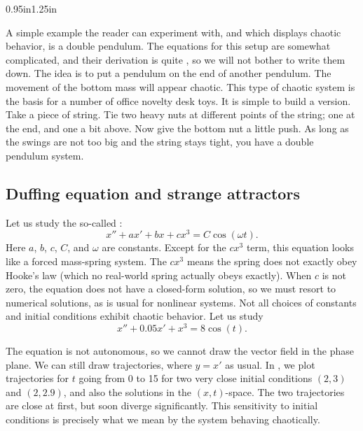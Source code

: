 \begin{mywrapfigsimp}{0.95in}{1.25in}
\noindent
{}
\end{mywrapfigsimp}
A simple example the reader can experiment with, and which displays
chaotic behavior, is a double pendulum.  The equations for this
setup are somewhat complicated, and their derivation is quite
, so we
will not bother to write them down.  The idea is to put a pendulum on the
end of another pendulum.  The movement of the bottom mass
will appear chaotic.  This type of chaotic system is the basis for a
number of office novelty desk toys.  It is simple to build a
version.  Take a piece of string.  Tie two heavy nuts at different
points of the string; one at the end, and one a bit above.  Now give the
bottom nut a little push.  As long as the swings are not too big and the
string stays tight, you have a double pendulum system.

\subsection{Duffing equation and strange attractors}

Let us study the so-called \emph{}:
\begin{equation*}
x'' + a x' + bx + cx^3 = C \cos(\omega t) .
\end{equation*}
Here $a$, $b$, $c$, $C$, and $\omega$ are constants.
Except for the $c x^3$ term, this equation looks like
a forced mass-spring system.  The $c x^3$ means the spring does
not exactly obey Hooke's law (which no real-world spring actually obeys
exactly).  When $c$ is not zero, the equation does not have a
closed-form solution, so we must resort to numerical solutions,
as is usual for nonlinear systems.
Not all choices of constants and initial conditions
exhibit chaotic behavior.  Let us study
\begin{equation*}
x''+0.05 x' + x^3 = 8\cos(t) .
\end{equation*}

The equation is not autonomous, so we cannot 
draw the vector field in the phase plane.
We can still draw
trajectories, where $y=x'$ as usual.   
In , we plot trajectories for $t$ going from 0
to 15 for two very close initial conditions
$(2,3)$ and $(2,2.9)$, and also the solutions in the $(x,t)$-space.  The two
trajectories are close at first, but soon diverge significantly.
This sensitivity to initial conditions is precisely what
we mean by the system behaving chaotically.

